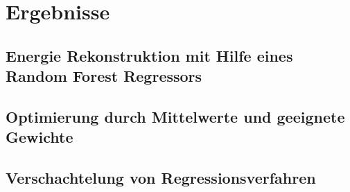 \chapter{Ergebnisse}

\section{Energie Rekonstruktion mit Hilfe eines Random Forest Regressors}


\section{Optimierung durch Mittelwerte und geeignete Gewichte}


\section{Verschachtelung von Regressionsverfahren}

